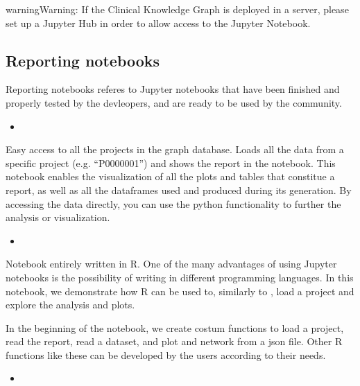 \documentclass[letterpaper,10pt,english]{sphinxmanual}
\begin{document}
\begin{sphinxadmonition}{warning}{Warning:}
If the Clinical Knowledge Graph is deployed in a server, please set up a Jupyter Hub in order to allow access to the Jupyter Notebook.
\end{sphinxadmonition}


\subsection{Reporting notebooks}
\label{\detokenize{advanced_features/ckg-notebooks:reporting-notebooks}}
Reporting notebooks referes to Jupyter notebooks that have been finished and properly tested by the devleopers, and are ready to be used by the community.
\begin{itemize}
\item {} 

\end{itemize}

Easy access to all the projects in the graph database. Loads all the data from a specific project (e.g. “P0000001”) and shows the report in the notebook.
This notebook enables the visualization of all the plots and tables that constitue a report, as well as all the dataframes used and produced during its generation.
By accessing the data directly, you can use the python functionality to further the analysis or visualization.
\begin{itemize}
\item {} 

\end{itemize}

Notebook entirely written in R. One of the many advantages of using Jupyter notebooks is the possibility of writing in different programming languages.
In this notebook, we demonstrate how R can be used to, similarly to , load a project and explore the analysis and plots.

In the beginning of the notebook, we create costum functions to load a project, read the report, read a dataset, and plot and network from a json file.
Other R functions like these can be developed by the users according to their needs.
\begin{itemize}
\item {} 

\end{itemize}
\end{document}
